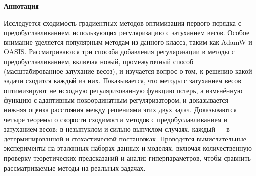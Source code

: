\begin{center}
    \Large{\textbf{Аннотация}}
\end{center}

Исследуется сходимость градиентных методов оптимизации первого порядка с предобуславливанием, использующих регуляризацию с затуханием весов.
Особое внимание уделяется популярным методам из данного класса, таким как AdamW и OASIS.
Рассматриваются три способа добавления регуляризации в методы с предобуславливанием, включая новый, промежуточный способ (масштабированное затухание весов), и изучается вопрос о том, к решению какой задачи сходится каждый из них.
Показывается, что методы с затуханием весов оптимизируют не исходную регуляризованную функцию потерь, а изменённую функцию с адаптивным покоординатным регуляризатором, и доказывается нижняя оценка расстояния между решениями этих двух задач.
Доказываются четыре теоремы о скорости сходимости методов с предобуславливанием и затуханием весов: в невыпуклом и сильно выпуклом случаях, каждый --- в детерминированной и стохастической постановках.
Проводятся вычислительные эксперименты на эталонных наборах данных и моделях, включая количественную проверку теоретических предсказаний и анализ гиперпараметров, чтобы сравнить рассматриваемые методы на реальных задачах.
